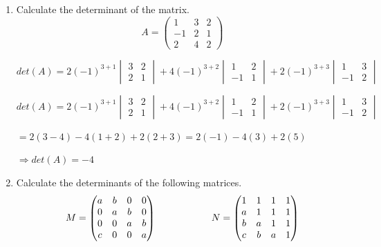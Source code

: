 \documentclass[fleqn]{article}
\begin{document}
  \begin{enumerate}
    \item  Calculate the determinant of the matrix. $$A = 
      \begin{pmatrix}
      1 & 3 & 2 \\
      -1 & 2 & 1 \\
      2 & 4 & 2
      \end{pmatrix} $$

      \textcolor{hwColor}{
        $det(A)=2(-1)^{3+1}
        \begin{vmatrix}
          3 & 2 \\
          2 & 1
        \end{vmatrix}
        +
        4(-1)^{3+2}
        \begin{vmatrix}
          1 & 2 \\
          -1 & 1
        \end{vmatrix}
        +
        2(-1)^{3+3}
        \begin{vmatrix}
          1 & 3 \\
          -1 & 2
        \end{vmatrix}
        $
      }

      \textcolor{hwColor}{
        $det(A)=2(-1)^{3+1}
        \begin{vmatrix}
          3 & 2 \\
          2 & 1
        \end{vmatrix}
        +
        4(-1)^{3+2}
        \begin{vmatrix}
          1 & 2 \\
          -1 & 1
        \end{vmatrix}
        +
        2(-1)^{3+3}
        \begin{vmatrix}
          1 & 3 \\
          -1 & 2
        \end{vmatrix}
        $
      }

      \textcolor{hwColor}{
        $
        = 2(3-4)-4(1+2)+2(2+3)
        = 2(-1)-4(3)+2(5)
        $  
      }

      \textcolor{hwColor}{
        $
        \Longrightarrow
        det(A)=-4
        $
      }

    \item  Calculate the determinants of the following matrices. $$M = 
      \begin{pmatrix}
      a & b & 0 & 0 \\
      0 & a & b & 0 \\
      0 & 0 & a & b \\
      c & 0 & 0 & a
      \end{pmatrix} \hskip 2truecm
      N=\begin{pmatrix}
        1 & 1 & 1 & 1 \\
        a & 1 & 1 & 1 \\
        b &a & 1 & 1 \\
        c & b & a & 1
      \end{pmatrix}
      $$


\end{enumerate}
\end{document}
